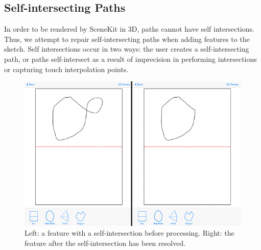 \subsection{Self-intersecting Paths}\label{self-intersecting-paths}

In order to be rendered by SceneKit in 3D, paths cannot have self
intersections. Thus, we attempt to repair self-intersecting paths when
adding features to the sketch. Self intersections occur in two ways: the
user creates a self-intersecting path, or paths self-intersect as a
result of imprecision in performing intersections or capturing touch
interpolation points. ~ ~

\begin{figure}[htbp]
\centering
\includegraphics{figures/41_Tech_Tool_Implementation/loopBeforeAfter.pdf}
\caption{Left: a feature with a self-intersection before processing.
Right: the feature after the self-intersection has been resolved.}
\end{figure}

